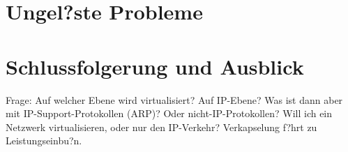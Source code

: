 \documentclass{lni}
\begin{document}
\section{Ungel?ste Probleme}
\label{sec:offenefragen}

\section{Schlussfolgerung und Ausblick}
\label{sec:schluss}
Frage: Auf welcher Ebene wird virtualisiert? Auf IP-Ebene? Was ist dann aber mit IP-Support-Protokollen (ARP)? Oder nicht-IP-Protokollen? Will ich ein Netzwerk virtualisieren, oder nur den IP-Verkehr? Verkapselung f?hrt zu Leistungseinbu?n. \cite{cabuk2007towards}



{}
\end{document}
